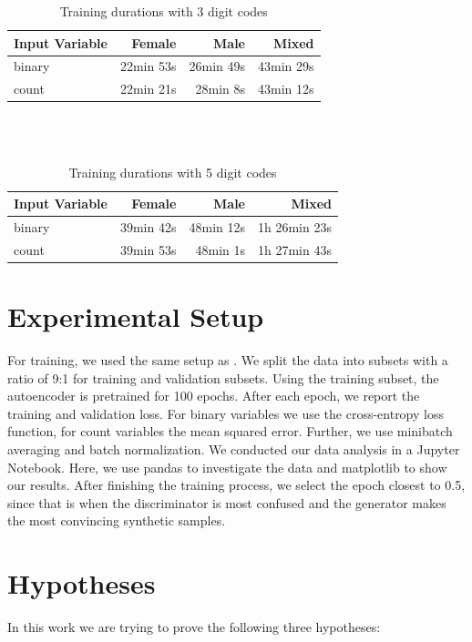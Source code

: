 \documentclass[11pt, a4paper, oneside]{book}
\begin{document}
\begin{table}
\begin{center}
\begin{tabularx}{\textwidth}{X|r|r|r}
\textbf{Input Variable} & \textbf{Female} & \textbf{Male} & \textbf{Mixed} \\
\hline
binary & 22min 53s & 26min 49s & 43min 29s\\
count & 22min 21s & 28min 8s & 43min 12s\\
\end{tabularx}
\caption{Training durations with 3 digit codes}
\end{center}
\end{table}
\\
\\
\begin{table}
\begin{center}
\begin{tabularx}{\textwidth}{X|r|r|r}
\textbf{Input Variable} & \textbf{Female} & \textbf{Male} & \textbf{Mixed} \\
\hline
binary & 39min 42s & 48min 12s & 1h 26min 23s\\
count & 39min 53s & 48min 1s & 1h 27min 43s\\
\end{tabularx}
\caption{Training durations with 5 digit codes}
\end{center}
\end{table}

\section{Experimental Setup}
 For training, we used the same setup as \citep{Choi2017}. We split the data into subsets with a ratio of 9:1 for training and validation subsets. Using the training subset, the autoencoder is pretrained for 100 epochs. 
 After each epoch, we report the training and validation loss. For binary variables we use the cross-entropy loss  function, for count variables the mean squared error.
 Further, we use minibatch averaging and batch normalization.
We conducted our data analysis in a Jupyter Notebook. Here, we use pandas to investigate the data and matplotlib to show our results.
After finishing the training process, we select the epoch closest to 0.5, since that is when the discriminator is most confused and the generator makes the most convincing synthetic samples.


\section{Hypotheses}
In this work we are trying to prove the following three hypotheses:
\end{document}
